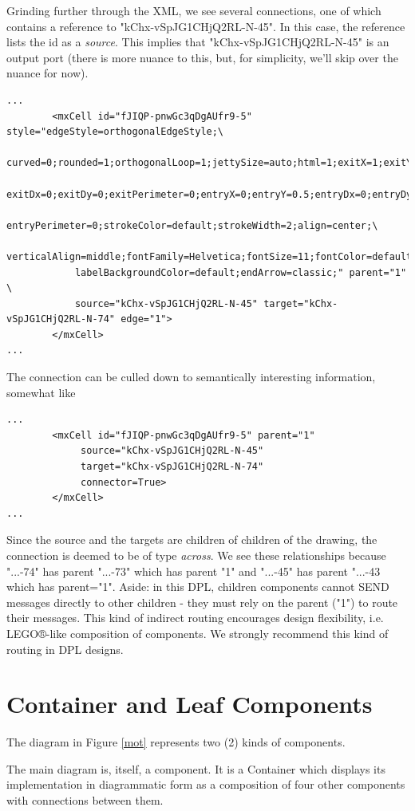 \documentclass[10pt,anonymous,review]{acmart}
\begin{document}
Grinding further through the XML, we see several connections, one of which contains a reference to "kChx-vSpJG1CHjQ2RL-N-45". In this case, the reference lists the id as a \emph{source}. This implies that "kChx-vSpJG1CHjQ2RL-N-45" is an output port (there is more nuance to this, but, for simplicity, we'll skip over the nuance for now).
\begin{verbatim}
...
        <mxCell id="fJIQP-pnwGc3qDgAUfr9-5" style="edgeStyle=orthogonalEdgeStyle;\
            curved=0;rounded=1;orthogonalLoop=1;jettySize=auto;html=1;exitX=1;exitY=0.5;\
            exitDx=0;exitDy=0;exitPerimeter=0;entryX=0;entryY=0.5;entryDx=0;entryDy=0;\
            entryPerimeter=0;strokeColor=default;strokeWidth=2;align=center;\
            verticalAlign=middle;fontFamily=Helvetica;fontSize=11;fontColor=default;\
            labelBackgroundColor=default;endArrow=classic;" parent="1" \
            source="kChx-vSpJG1CHjQ2RL-N-45" target="kChx-vSpJG1CHjQ2RL-N-74" edge="1">
        </mxCell>
...  
\end{verbatim}
The connection can be culled down to semantically interesting information, somewhat like
\begin{verbatim}
...
        <mxCell id="fJIQP-pnwGc3qDgAUfr9-5" parent="1"
             source="kChx-vSpJG1CHjQ2RL-N-45"
             target="kChx-vSpJG1CHjQ2RL-N-74"
             connector=True>
        </mxCell>
...  
\end{verbatim}
Since the source and the targets are children of children of the drawing, the connection is deemed to be of type \emph{across}.
We see these relationships because "...-74" has parent "...-73" which has parent "1" and "...-45" has parent "...-43 which has parent="1". Aside: in this DPL, children components cannot SEND messages directly to other children - they must rely on the parent ("1") to route their messages. This kind of indirect routing encourages design flexibility, i.e. LEGO®-like composition of components. We strongly recommend this kind of routing in DPL designs.

\section{Container and Leaf Components} \label{containerleaf}
The diagram in Figure \ref{mot} represents two (2) kinds of components.

The main diagram is, itself, a component. It is a Container which displays its implementation in diagrammatic form as a composition of four other components with connections between them.
\end{document}
